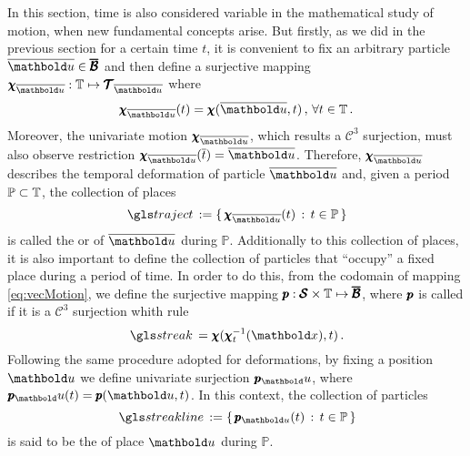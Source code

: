 In this section, time is also considered variable in the mathematical study of motion, when new fundamental concepts arise. But firstly, as we did in the previous section for a certain time $t$, it is convenient to fix an arbitrary particle $\overline{\vto{u}}\in\tnr{\overline{\mathcal{B}}}$ and then define a surjective mapping $\map{\tnr{\chi}_{\overline{\vto{u}}}}{\tempo}{\tnr{\mathcal{T}}_{\overline{\vto{u}}}}$ where 
\begin{equation}
\fua{\tnr{\chi}_{\overline{\vto{u}}}}{t}=\fua{\tnr{\chi}}{\overline{\vto{u}},t}\,,\,\forall t\in\tempo\,.
\end{equation}
Moreover, the univariate motion $\tnr{\chi}_{\overline{\vto{u}}}$, which results a $\mathcal{C}^{3}$ surjection, must also  observe restriction 
$\fua{\tnr{\chi}_{\overline{\vto{u}}}}{\overline{t}}=\overline{\vto{u}}$. Therefore, $\tnr{\chi}_{\overline{\vto{u}}}$ describes the temporal deformation of particle $\overline{\vto{u}}$ and, given a period $\mathbb{P}\subset\mathbb{T}$, the collection of places 
\begin{equation}
\gloref{traject}:=\{\,\fua{\tnr{\chi}_{\overline{\vto{u}}}}{t}\,:\,t\in\mathbb{P}\,\}
\end{equation}
is called the  or  of $\overline{\vto{u}}$ during $\mathbb{P}$. Additionally to this collection of places, it is also important to define the collection of particles that ``occupy'' a fixed place during a period of time. In order to do this, from the codomain of mapping \eqref{eq:vecMotion}, we define the surjective mapping $\pmb{p} : \pmb{\mathcal{S}}\times\mathbb{T} \mapsto \pmb{\overline{\mathcal{B}}}$, where $\pmb{p}$ is called  if it is a $\mathcal{C}^3$ surjection whith rule
\begin{equation}
\gloref{streak}=\tnr{\chi}(\fua{\tnr{\chi}_{t}^{-1}}{\vto{x}},t)\,.
\end{equation}
Following the same procedure adopted for deformations, by fixing a position $\vto{u}$ we define univariate surjection $\tnr{p}_\vto{u}$, where $\fua{\tnr{p}_\vto{u}}{t}=\fua{\tnr{p}}{\vto{u},t}$. In this context, the collection of particles
\begin{equation}
\gloref{streakline}:=\{\,\fua{\tnr{p}_{\vto{u}}}{t}\,:\,t\in\mathbb{P}\,\}
\end{equation}
is said to be the  of place $\vto{u}$ during $\mathbb{P}$. 


